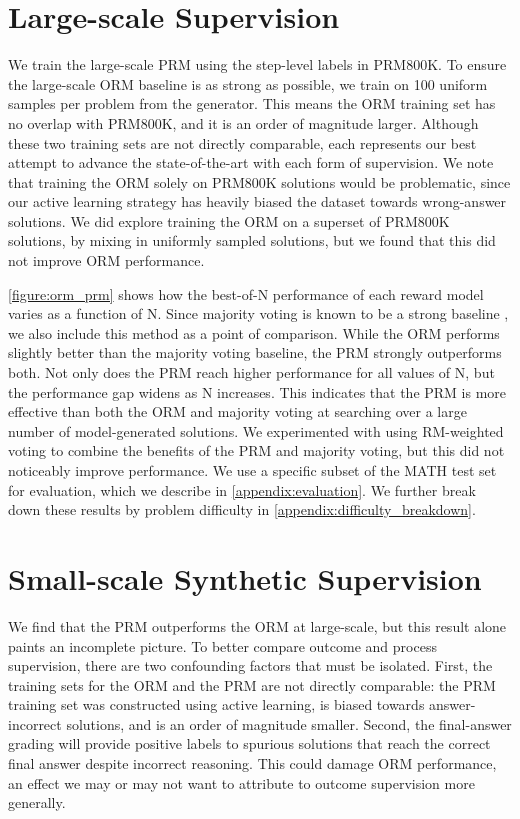 \section{Large-scale Supervision}
\label{section:large_scale}

We train the large-scale PRM using the step-level labels in PRM800K. To ensure the large-scale ORM baseline is as strong as possible, we train on 100 uniform samples per problem from the generator. This means the ORM training set has no overlap with PRM800K, and it is an order of magnitude larger. Although these two training sets are not directly comparable, each represents our best attempt to advance the state-of-the-art with each form of supervision. We note that training the ORM solely on PRM800K solutions would be problematic, since our active learning strategy has heavily biased the dataset towards wrong-answer solutions. We did explore training the ORM on a superset of PRM800K solutions, by mixing in uniformly sampled solutions, but we found that this did not improve ORM performance.

\ref{figure:orm_prm} shows how the best-of-N performance of each reward model varies as a function of N. Since majority voting is known to be a strong baseline \citep{wang2022self, lewkowycz2022solving}, we also include this method as a point of comparison. While the ORM performs slightly better than the majority voting baseline, the PRM strongly outperforms both. Not only does the PRM reach higher performance for all values of N, but the performance gap widens as N increases. This indicates that the PRM is more effective than both the ORM and majority voting at searching over a large number of model-generated solutions. We experimented with using RM-weighted voting \citep{li2022advance, uesato2022solving} to combine the benefits of the PRM and majority voting, but this did not noticeably improve performance. We use a specific subset of the MATH test set for evaluation, which we describe in \ref{appendix:evaluation}. We further break down these results by problem difficulty in \ref{appendix:difficulty_breakdown}.

\section{Small-scale Synthetic Supervision} \label{section:synthetic_supervision}

We find that the PRM outperforms the ORM at large-scale, but this result alone paints an incomplete picture. To better compare outcome and process supervision, there are two confounding factors that must be isolated. First, the training sets for the ORM and the PRM are not directly comparable: the PRM training set was constructed using active learning, is biased towards answer-incorrect solutions, and is an order of magnitude smaller. Second, the final-answer grading will provide positive labels to spurious solutions that reach the correct final answer despite incorrect reasoning. This could damage ORM performance, an effect we may or may not want to attribute to outcome supervision more generally.

